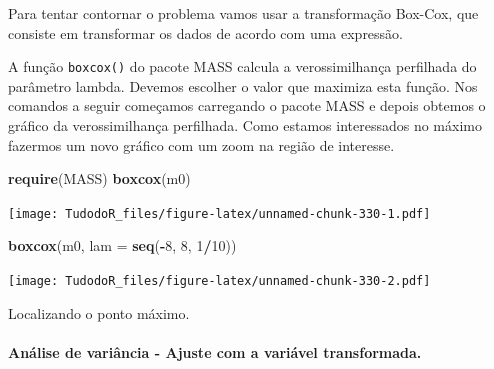 \documentclass[
]{book}
\newenvironment{Shaded}{\begin{snugshade}}{\end{snugshade}}
\newcommand{\DataTypeTok}[1]{\textcolor[rgb]{0.13,0.29,0.53}{#1}}
\newcommand{\DecValTok}[1]{\textcolor[rgb]{0.00,0.00,0.81}{#1}}
\newcommand{\KeywordTok}[1]{\textcolor[rgb]{0.13,0.29,0.53}{\textbf{#1}}}
\newcommand{\NormalTok}[1]{#1}
\newcommand{\OperatorTok}[1]{\textcolor[rgb]{0.81,0.36,0.00}{\textbf{#1}}}
\newcommand{\StringTok}[1]{\textcolor[rgb]{0.31,0.60,0.02}{#1}}
\begin{document}
Para tentar contornar o problema vamos usar a transformação Box-Cox, que consiste em transformar os dados de acordo com uma expressão.

A função \texttt{boxcox()} do pacote MASS calcula a verossimilhança perfilhada do parâmetro lambda. Devemos escolher o valor que maximiza esta função. Nos comandos a seguir começamos carregando o pacote MASS e depois obtemos o gráfico da verossimilhança perfilhada. Como estamos interessados no máximo fazermos um novo gráfico com um zoom na região de interesse.

\begin{Shaded}
\begin{Highlighting}[]
\KeywordTok{require}\NormalTok{(MASS) }
  \KeywordTok{boxcox}\NormalTok{(m0)}
\end{Highlighting}
\end{Shaded}

\texttt{[image: TudodoR\_files/figure-latex/unnamed-chunk-330-1.pdf]}

\begin{Shaded}
\begin{Highlighting}[]
  \KeywordTok{boxcox}\NormalTok{(m0, }\DataTypeTok{lam =} \KeywordTok{seq}\NormalTok{(}\OperatorTok{-}\DecValTok{8}\NormalTok{, }\DecValTok{8}\NormalTok{, }\DecValTok{1}\OperatorTok{/}\DecValTok{10}\NormalTok{))}
\end{Highlighting}
\end{Shaded}

\texttt{[image: TudodoR\_files/figure-latex/unnamed-chunk-330-2.pdf]}

Localizando o ponto máximo.

\hypertarget{anuxe1lise-de-variuxe2ncia---ajuste-com-a-variuxe1vel-transformada.-1}{%
\paragraph{Análise de variância - Ajuste com a variável transformada.}\label{anuxe1lise-de-variuxe2ncia---ajuste-com-a-variuxe1vel-transformada.-1}}

\begin{Shaded}
\end{Shaded}
\end{document}
